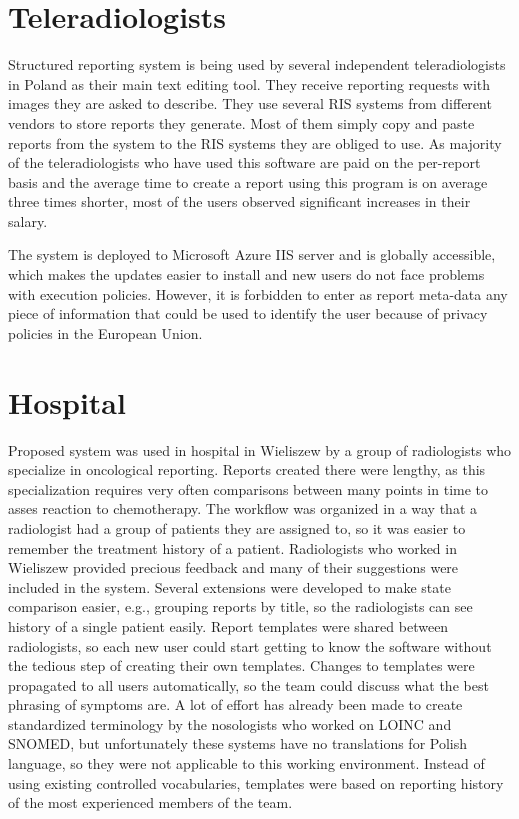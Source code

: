 \documentclass[12pt, twoside, openany]{report}
\theoremstyle{definition}
\begin{document}
\section{Teleradiologists}
Structured reporting system is being used by several independent teleradiologists in Poland as their main text editing tool. They receive reporting requests with images they are asked to describe. They use several RIS systems from different vendors to store reports they generate. Most of them simply copy and paste reports from the system to the RIS systems they are obliged to use. As majority of the teleradiologists who have used this software are paid on the per-report basis and the average time to create a report using this program is on average three times shorter, most of the users observed significant increases in their salary. 

The system is deployed to Microsoft Azure IIS server and is globally accessible, which makes the updates easier to install and new users do not face problems with execution policies. However, it is forbidden to enter as report meta-data any piece of information that could be used to identify the user because of privacy policies in the European Union. 

\section{Hospital}
Proposed system was used in hospital in Wieliszew by a group of radiologists who specialize in oncological reporting. Reports created there were lengthy, as this specialization requires very often comparisons between many points in time to asses reaction to chemotherapy. The workflow was organized in a way that a radiologist had a group of patients they are assigned to, so it was easier to remember the treatment history of a patient. Radiologists who worked in Wieliszew provided precious feedback and many of their suggestions were included in the system. Several extensions were developed to make state comparison easier, e.g., grouping reports by title, so the radiologists can see history of a single patient easily. 
Report templates were shared between radiologists, so each new user could start getting to know the software without the tedious step of creating their own templates. Changes to templates were propagated to all users automatically, so the team could discuss what the best phrasing of symptoms are. A lot of effort has already been made to create standardized terminology by the nosologists who worked on LOINC and SNOMED, but unfortunately these systems have no translations for Polish language, so they were not applicable to this working environment. Instead of using existing controlled vocabularies, templates were based on reporting history of the most experienced members of the team.
\end{document}
